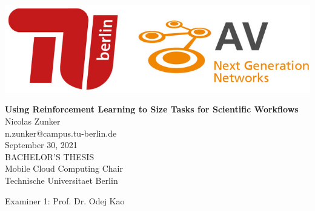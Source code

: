 
\thispagestyle{empty}

\includegraphics[width=\linewidth]{fig/Logo_Header}
\mbox{}\\[1pc]
\begin{center}
    \huge{ \bfseries Using Reinforcement Learning to Size Tasks for Scientific Workflows}\\[2pc]

    \Large{Nicolas Zunker}\\
    \large{n.zunker@campus.tu-berlin.de}\\[1pc]
    \large{September 30, 2021}\\[2pc]

    BACHELOR'S THESIS\\
    Mobile Cloud Computing Chair\\
    Technische Universitaet Berlin
\end{center}
\vfill

Examiner 1: Prof. Dr. Odej Kao
\hfill{}\\

\afterpage{\null\thispagestyle{empty}\newpage}
